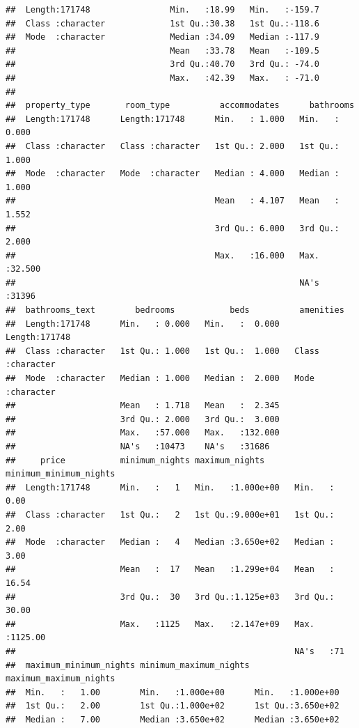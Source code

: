 \documentclass[
]{article}
\begin{document}
\begin{verbatim}
##  Length:171748                Min.   :18.99   Min.   :-159.7  
##  Class :character             1st Qu.:30.38   1st Qu.:-118.6  
##  Mode  :character             Median :34.09   Median :-117.9  
##                               Mean   :33.78   Mean   :-109.5  
##                               3rd Qu.:40.70   3rd Qu.: -74.0  
##                               Max.   :42.39   Max.   : -71.0  
##                                                               
##  property_type       room_type          accommodates      bathrooms     
##  Length:171748      Length:171748      Min.   : 1.000   Min.   : 0.000  
##  Class :character   Class :character   1st Qu.: 2.000   1st Qu.: 1.000  
##  Mode  :character   Mode  :character   Median : 4.000   Median : 1.000  
##                                        Mean   : 4.107   Mean   : 1.552  
##                                        3rd Qu.: 6.000   3rd Qu.: 2.000  
##                                        Max.   :16.000   Max.   :32.500  
##                                                         NA's   :31396   
##  bathrooms_text        bedrooms           beds          amenities        
##  Length:171748      Min.   : 0.000   Min.   :  0.000   Length:171748     
##  Class :character   1st Qu.: 1.000   1st Qu.:  1.000   Class :character  
##  Mode  :character   Median : 1.000   Median :  2.000   Mode  :character  
##                     Mean   : 1.718   Mean   :  2.345                     
##                     3rd Qu.: 2.000   3rd Qu.:  3.000                     
##                     Max.   :57.000   Max.   :132.000                     
##                     NA's   :10473    NA's   :31686                       
##     price           minimum_nights maximum_nights      minimum_minimum_nights
##  Length:171748      Min.   :   1   Min.   :1.000e+00   Min.   :   0.00       
##  Class :character   1st Qu.:   2   1st Qu.:9.000e+01   1st Qu.:   2.00       
##  Mode  :character   Median :   4   Median :3.650e+02   Median :   3.00       
##                     Mean   :  17   Mean   :1.299e+04   Mean   :  16.54       
##                     3rd Qu.:  30   3rd Qu.:1.125e+03   3rd Qu.:  30.00       
##                     Max.   :1125   Max.   :2.147e+09   Max.   :1125.00       
##                                                        NA's   :71            
##  maximum_minimum_nights minimum_maximum_nights maximum_maximum_nights
##  Min.   :   1.00        Min.   :1.000e+00      Min.   :1.000e+00     
##  1st Qu.:   2.00        1st Qu.:1.000e+02      1st Qu.:3.650e+02     
##  Median :   7.00        Median :3.650e+02      Median :3.650e+02     

\end{verbatim}
\end{document}
